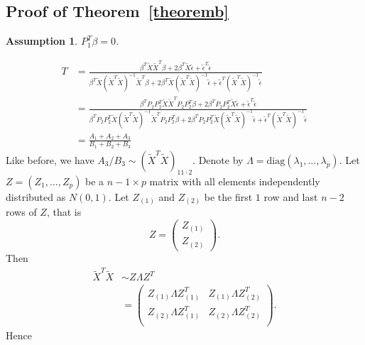\documentclass[review]{elsarticle}
\theoremstyle{plain}
\newtheorem{assumption}{\quad\quad Assumption}
\theoremstyle{definition}
\theoremstyle{remark}
\begin{document}
\subsection{Proof of Theorem~\ref{theoremb}}
\begin{assumption}
$P_1^T \beta=0$.
\end{assumption}


\begin{equation*}
    \begin{aligned}
        T&=\frac{\beta^T \tilde{X}\tilde{X}^T \beta+
        2\beta^T \tilde{X}\tilde{\epsilon}+
        \tilde{\epsilon}^T\tilde{\epsilon}
    }{\beta^T \tilde{X}{(\tilde{X}^T\tilde{X})}^{-1}\tilde{X}^T \beta+
        2\beta^T \tilde{X}{(\tilde{X}^T\tilde{X})}^{-1}\tilde{\epsilon}+
        \tilde{\epsilon}^T{(\tilde{X}^T\tilde{X})}^{-1}\tilde{\epsilon}
    }\\
        &=\frac{\beta^T P_2 P_2^T \tilde{X}\tilde{X}^T P_2 P_2^T\beta+
        2\beta^T P_2 P_2^T \tilde{X}\tilde{\epsilon}+
        \tilde{\epsilon}^T\tilde{\epsilon}
    }{\beta^T P_2 P_2^T\tilde{X}{(\tilde{X}^T\tilde{X})}^{-1}\tilde{X}^T P_2 P_2^T\beta+
        2\beta^T P_2 P_2^T\tilde{X}{(\tilde{X}^T\tilde{X})}^{-1}\tilde{\epsilon}+
        \tilde{\epsilon}^T{(\tilde{X}^T\tilde{X})}^{-1}\tilde{\epsilon}
    }\\
        &=\frac{A_1+A_2+A_3}{B_1+B_2+B_3}
    \end{aligned}
\end{equation*}
 Like before, we have $A_3/B_3\sim {(\tilde{X}^T\tilde{X})}_{11\cdot 2}$. Denote by $\Lambda=\textrm{diag} (\lambda_1,\ldots,\lambda_p)$. Let $Z=(Z_1,\ldots,Z_p)$ be a $n-1\times p$ matrix with all elements independently distributed as $N(0,1)$. Let $Z_{(1)}$ and $Z_{(2)}$ be the first $1$ row and last $n-2$ rows of $Z$, that is
\[
    Z=\begin{pmatrix} 
        Z_{(1)}\\
        Z_{(2)}
    \end{pmatrix}.
    \]
Then
\begin{equation*}
    \begin{aligned}
        \tilde{X}^T\tilde{X}&\sim Z\Lambda Z^T\\
        &=\begin{pmatrix}
            Z_{(1)}\Lambda Z_{(1)}^T & Z_{(1)}\Lambda Z_{(2)}^T\\
            Z_{(2)}\Lambda Z_{(1)}^T & Z_{(2)}\Lambda Z_{(2)}^T\\
        \end{pmatrix}.
    \end{aligned}
\end{equation*}
Hence
\end{document}
